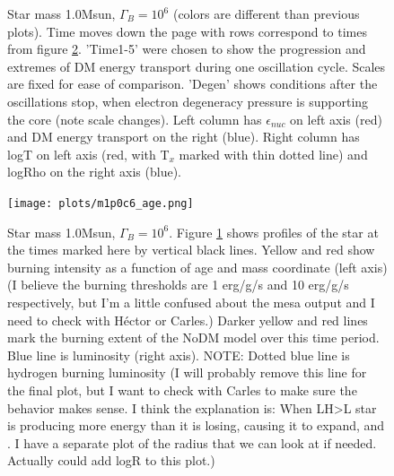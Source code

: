\documentclass[useAMS,usenatbib]{mnras}
\begin{document}
\begin{figure}
    \caption{Star mass 1.0Msun, $\Gamma_B = 10^6$ (colors are different than previous plots). Time moves down the page with rows correspond to times from figure \ref{fig:m1p0_kipp}. 'Time1-5' were chosen to show the progression and extremes of DM energy transport during one oscillation cycle. Scales are fixed for ease of comparison. 'Degen' shows conditions after the oscillations stop, when electron degeneracy pressure is supporting the core (note scale changes). Left column has $\epsilon_{nuc}$ on left axis (red) and DM energy transport on the right (blue). Right column has logT on left axis (red, with T$_x$ marked with thin dotted line) and logRho on the right axis (blue).
    }
    \label{fig:m1p0_profs}
  \end{figure}

  \begin{figure}
    \centering
    \texttt{[image: plots/m1p0c6\_age.png]}
    \caption{Star mass 1.0Msun, $\Gamma_B = 10^6$.  Figure \ref{fig:m1p0_profs} shows profiles of the star at the times marked here by vertical black lines.
    Yellow and red show burning intensity as a function of age and mass coordinate (left axis) (I believe the burning thresholds are 1 erg/g/s and 10 erg/g/s respectively, but I'm a little confused about the mesa output and I need to check with Héctor or Carles.) Darker yellow and red lines mark the burning extent of the NoDM model over this time period.
    Blue line is luminosity (right axis). NOTE: Dotted blue line is hydrogen burning luminosity (I will probably remove this line for the final plot, but I want to check with Carles to make sure the behavior makes sense. I think the explanation is: When LH>L star is producing more energy than it is losing, causing it to expand, and . I have a separate plot of the radius that we can look at if needed. Actually could add logR to this plot.)
    }
    \label{fig:m1p0_kipp}
  \end{figure}
\end{document}
